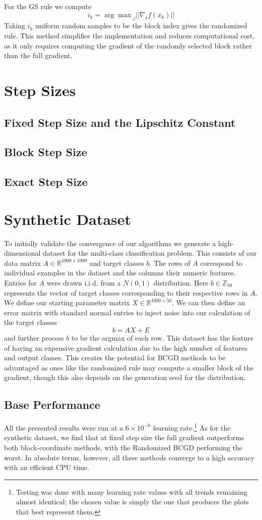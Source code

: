 \documentclass{article}
\begin{document}
For the GS rule we compute 
$$i_k = {\arg\max}_j ||\nabla_j f(x_k)||$$
Taking $i_k$ uniform random samples to be the block index gives the randomized rule. This method simplifies the implementation and reduces computational cost, as it only requires computing the gradient of the randomly selected block rather than the full gradient.

\section{Step Sizes}
\subsection{Fixed Step Size and the Lipschitz Constant}
\subsection{Block Step Size}
\subsection{Exact Step Size}

\section{Synthetic Dataset}
To initially validate the convergence of our algorithms we generate a high-dimensional dataset for the multi-class classification problem. This consists of our data matrix $A \in \mathbb{R}^{1000 \times 1000}$ and target classes $b$. The rows of $A$ correspond to individual examples in the dataset and the columns their numeric features. Entries for $A$ were drawn i.i.d. from a $N(0,1)$ distribution. Here $b \in \mathbb{Z}_{50}$ represents the vector of target classes corresponding to their respective rows in $A$. We define our starting parameter matrix $X \in \mathbb{R}^{1000 \times 50}$. We can then define an error matrix with standard normal entries to inject noise into our calculation of the target classes
$$b = AX + E$$
and further process $b$ to be the argmax of each row. This dataset has the feature of having an expensive gradient calculation due to the high number of features and output classes. This creates the potential for BCGD methods to be advantaged as ones like the randomized rule may compute a smaller block of the gradient, though this also depends on the generation seed for the distribution.

\subsection{Base Performance}
All the presented results were run at a $6 \times 10^{-6}$ learning rate.\footnote{Testing was done with many learning rate values with all trends remaining almost identical; the chosen value is simply the one that produces the plots that best represent them.}
As for the synthetic dataset, we find that at fixed step size the full gradient outperforms both block-coordinate methods, with the Randomized BCGD performing the worst. In absolute terms, however, all three methods converge to a high accuracy with an efficient CPU time.
\end{document}

